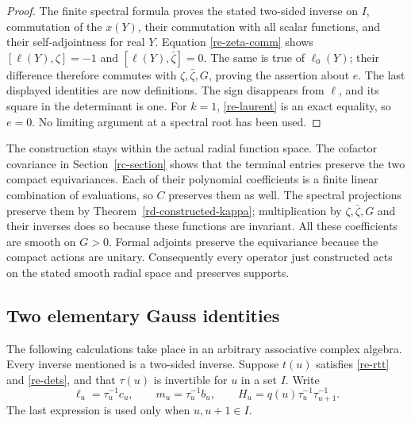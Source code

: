 \begin{proof}
The finite spectral formula proves the stated two-sided
inverse on \(I\), commutation of the \(x(Y)\), their
commutation with all scalar functions, and their
self-adjointness for real \(Y\).
Equation \eqref{re-zeta-comm} shows
\([\ell(Y),\zeta]=-1\) and
\([\ell(Y),\bar\zeta]=0\).
The same is true of \(\ell_0(Y)\); their difference therefore
commutes with \(\zeta,\bar\zeta,G\), proving the assertion about
\(e\).  The last displayed identities are now definitions.
The sign disappears from \(\ell\), and its square in the
determinant is one.  For \(k=1\), \eqref{re-laurent} is an
exact equality, so \(e=0\).  No limiting argument at a spectral
root has been used.
\end{proof}

The construction stays within the actual radial function space.
The cofactor covariance in Section~\ref{rc-section} shows that
the terminal entries preserve the two compact equivariances.
Each of their polynomial coefficients is a finite linear
combination of evaluations, so \(C\) preserves them as well.
The spectral projections preserve them by
Theorem~\ref{rd-constructed-kappa}; multiplication by
\(\zeta,\bar\zeta,G\) and their inverses does so because these
functions are invariant.  All these coefficients are smooth on
\(G>0\).  Formal adjoints preserve the equivariance because
the compact actions are unitary.  Consequently every operator
just constructed acts on the stated smooth radial space and
preserves supports.

\subsection{Two elementary Gauss identities}

The following calculations take place in an arbitrary
associative complex algebra.  Every inverse mentioned is a
two-sided inverse.  Suppose \(t(u)\) satisfies
\eqref{re-rtt} and \eqref{re-dets}, and that \(\tau(u)\) is
invertible for \(u\) in a set \(I\).  Write
\[
 \ell_u=\tau_u^{-1}c_u,\qquad
 m_u=\tau_u^{-1}b_u,\qquad
 H_u=q(u)\tau_u^{-1}\tau_{u+1}^{-1}.
\]
The last expression is used only when \(u,u+1\in I\).

